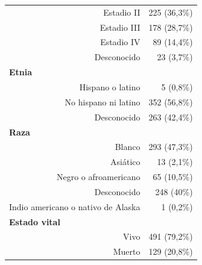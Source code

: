 \begin{table}[H]
\begin{tabular}{rr}
		Estadio II                                 & 225 (36,3\%)                                              \\
		Estadio III                                & 178 (28,7\%)                                              \\
		Estadio IV                                 & 89 (14,4\%)                                               \\
		Desconocido                                & 23 (3,7\%)                                                \\ \hline
		\multicolumn{1}{l}{\textbf{Etnia}}         &                                                           \\
		Hispano o latino                           & 5 (0,8\%)                                                 \\
		No hispano ni latino                       & 352 (56,8\%)                                              \\
		Desconocido                                & 263 (42,4\%)                                              \\ \hline
		\multicolumn{1}{l}{\textbf{Raza}}          &                                                           \\
		Blanco                                     & 293 (47,3\%)                                              \\
		Asiático                                   & 13 (2,1\%)                                                \\
		Negro o afroamericano                      & 65 (10,5\%)                                               \\
		Desconocido                                & 248 (40\%)                                                \\
		Indio americano o nativo de Alaska         & 1 (0,2\%)                                                 \\ \hline
		\multicolumn{1}{l}{\textbf{Estado vital}}  &                                                           \\
		Vivo                                       & 491 (79,2\%)                                              \\
		Muerto                                     & 129 (20,8\%)                                              \\ \hline
	\end{tabular}
\end{table}

